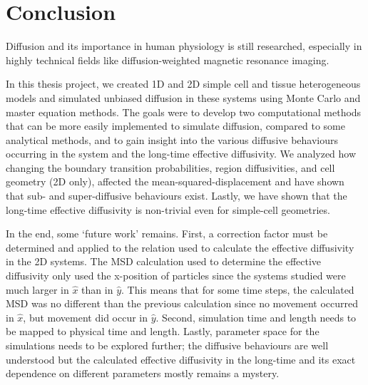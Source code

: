 \chapter{Conclusion}

	Diffusion and its importance in human physiology is still researched, especially in highly technical fields like diffusion-weighted magnetic resonance imaging.
	
	In this thesis project, we created 1D and 2D simple cell and tissue heterogeneous models and simulated unbiased diffusion in these systems using Monte Carlo and master equation methods. The goals were to develop two computational methods that can be more easily implemented to simulate diffusion, compared to some analytical methods, and to gain insight into the various diffusive behaviours occurring in the system and the long-time effective diffusivity. We analyzed how changing the boundary transition probabilities, region diffusivities, and cell geometry (2D only), affected the mean-squared-displacement and have shown that sub- and super-diffusive behaviours exist. Lastly, we have shown that the long-time effective diffusivity is non-trivial even for simple-cell geometries.
	
	In the end, some `future work' remains. First, a correction factor must be determined and applied to the relation used to calculate the effective diffusivity in the 2D systems. The MSD calculation used to determine the effective diffusivity only used the x-position of particles since the systems studied were much larger in $ \hat{x} $ than in $ \hat{y} $. This means that for some time steps, the calculated MSD was no different than the previous calculation since no movement occurred in $ \hat{x} $, but movement did occur in $ \hat{y} $. Second, simulation time and length needs to be mapped to physical time and length. Lastly, parameter space for the simulations needs to be explored further; the diffusive behaviours are well understood but the calculated effective diffusivity in the long-time and its exact dependence on different parameters mostly remains a mystery.